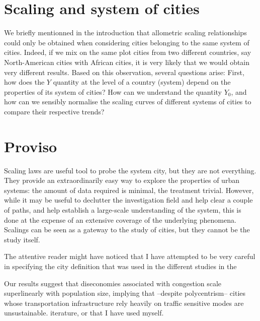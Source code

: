 \section{Scaling and system of cities}
\label{sec:scaling_and_system_of_cities}

We briefly mentionned in the introduction that allometric scaling relationships
could only be obtained when considering cities belonging to the same system of
cities. Indeed, if we mix on the same plot cities from two different countries,
say North-American cities with African cities, it is very likely that we would
obtain very different results. Based on this observation, several questions
arise: First, how does the $Y$ quantity at the level of a country (system)
depend on the properties of its system of cities? How can we understand the
quantity $Y_0$, and how can we sensibly normalise the scaling curves of
different systems of cities to compare their respective trends?

\section{Proviso}
\label{sec:poviso}

Scaling laws are useful tool to probe the system city, but they are not
everything. They provide an extraordinarily easy way to explore the properties
of urban systems: the amount of data required is minimal, the treatment
trivial. However, while it may be useful to declutter the investigation field
and help clear a couple of paths, and help establish a large-scale understanding
of the system, this is done at the expense of an extensive coverage of the
underlying phenomena. Scalings can be seen as a gateway to the study of cities,
but they cannot be the study itself.

The attentive reader might have noticed that I have attempted to be very careful
in specifying the city definition that was used in the different studies in the

Our results
suggest that diseconomies associated with congestion scale superlinearly with
population size, implying that --despite polycentrism-- cities whose
transportation infrastructure rely heavily on traffic sensitive modes are
unsustainable.
iterature, or that I have used myself.
